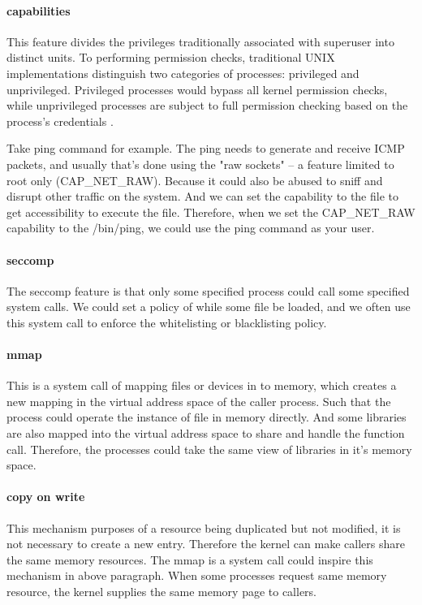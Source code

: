 \documentclass[12pt,a4paper]{article}
\begin{document}
\paragraph{capabilities}
This feature divides the privileges traditionally associated with superuser into
distinct units. To performing permission checks, traditional UNIX
implementations distinguish two categories of processes: privileged and unprivileged.
Privileged processes would bypass all kernel permission checks, while unprivileged
processes are subject to full permission checking based on the process's credentials
\cite{capabilities}.

Take ping command for example. The ping needs to generate and receive ICMP packets,
and usually that's done using the "raw sockets" – a feature limited to root only
(CAP\_NET\_RAW). Because it could also be abused to sniff and disrupt other traffic
on the system. And we can set the capability to the file to get accessibility to
execute the file.
Therefore, when we set the CAP\_NET\_RAW capability to the /bin/ping, we could use
the ping command as your user.

\paragraph{seccomp}
The seccomp feature is that only some specified process could call some specified
system calls. We could set a policy of while some file be loaded, and we often use
this system call to enforce the whitelisting or blacklisting policy.

\paragraph{mmap}
This is a system call of mapping files or devices in to memory, which creates a
new mapping in the virtual address space of the caller process. Such that
the process could operate the instance of file in memory directly.
And some libraries are also mapped into the virtual address space to share and handle
the function call. Therefore, the processes could take the same view of libraries in
it's memory space.

\paragraph{copy on write}
This mechanism purposes of a resource being duplicated but not modified, it is not
necessary to create a new entry. Therefore the kernel can make callers share
the same memory resources. The mmap is a system call could inspire this mechanism
in above paragraph. When some processes request same memory resource, the kernel
supplies the same memory page to callers.
\end{document}
